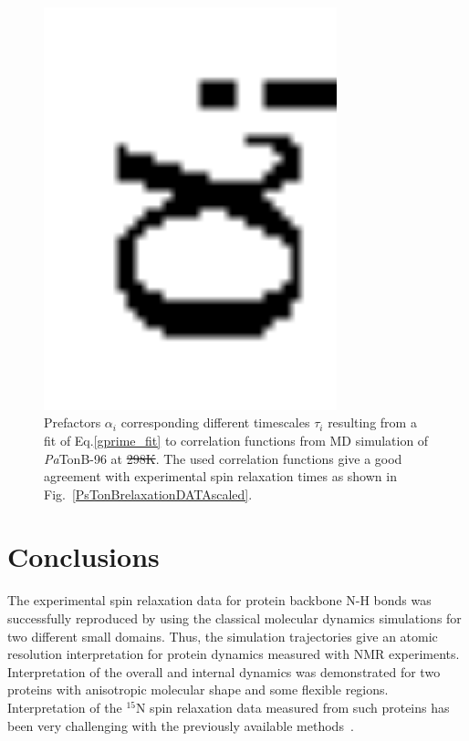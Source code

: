 \documentclass[journal=jpcbfk,manuscript=article]{achemso}
\providecommand{\DIFadd}[1]{{\protect\color{blue}\uwave{#1}}} %
\providecommand{\DIFdel}[1]{{\protect\color{red}\sout{#1}}}                      %
\providecommand{\DIFaddFL}[1]{\DIFadd{#1}} %
\providecommand{\DIFdelFL}[1]{\DIFdel{#1}} %
\providecommand{\DIFaddbeginFL}{} %
\providecommand{\DIFaddendFL}{} %
\providecommand{\DIFdelbeginFL}{} %
\providecommand{\DIFdelendFL}{} %
\begin{document}
\begin{figure}[!h]
  \includegraphics[width=8.5cm]{../Figs/coeffsPLOT.eps}%
  \caption{Prefactors $\alpha_i$ corresponding different timescales $\tau_i$
    resulting from a fit of Eq.\ref{gprime_fit} to correlation functions from
    MD simulation of {\it Pa}TonB-96 at \DIFdelbeginFL \DIFdelFL{298K}\DIFdelendFL \DIFaddbeginFL \DIFaddFL{298 K}\DIFaddendFL . The used correlation functions give
    a good agreement with experimental spin relaxation times as shown in
    Fig.~\ref{PsTonBrelaxationDATAscaled}.  \label{coeffsPLOT}}%
\end{figure}


\section{Conclusions}
The experimental spin relaxation data for protein backbone N-H bonds
was successfully reproduced by using the classical molecular dynamics
simulations for two different small domains.
Thus, the simulation trajectories give an atomic resolution
interpretation for protein dynamics measured with NMR experiments.
Interpretation of the overall and internal dynamics was demonstrated for
two proteins with anisotropic molecular shape and some flexible regions. 
Interpretation of the $^{15}$N spin relaxation data measured from
such proteins has been very challenging with the previously available
methods~\cite{barbato92,luginbuhl97}.
\end{document}
